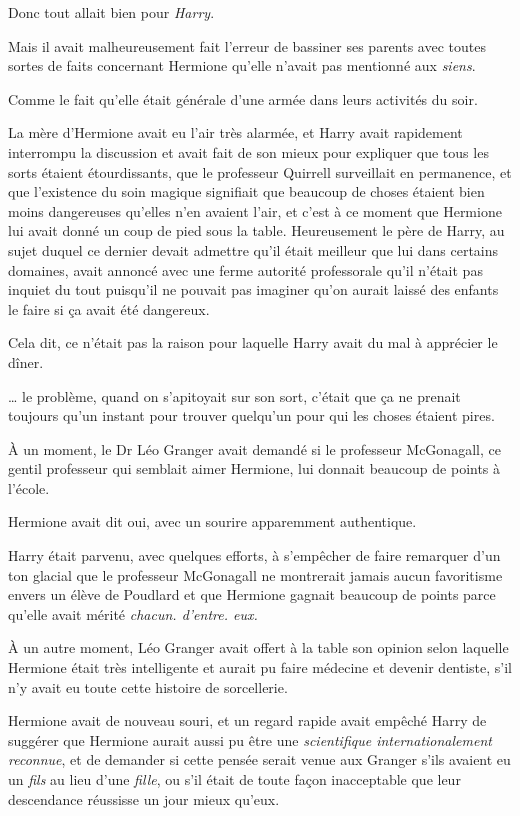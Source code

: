 Donc tout allait bien pour \emph{Harry}.

Mais il avait malheureusement fait l'erreur de bassiner ses parents avec toutes sortes de faits concernant Hermione qu'elle n'avait pas mentionné aux \emph{siens}.

Comme le fait qu'elle était générale d'une armée dans leurs activités du soir.

La mère d'Hermione avait eu l'air très alarmée, et Harry avait rapidement interrompu la discussion et avait fait de son mieux pour expliquer que tous les sorts étaient étourdissants, que le professeur Quirrell surveillait en permanence, et que l'existence du soin magique signifiait que beaucoup de choses étaient bien moins dangereuses qu'elles n'en avaient l'air, et c'est à ce moment que Hermione lui avait donné un coup de pied sous la table. Heureusement le père de Harry, au sujet duquel ce dernier devait admettre qu'il était meilleur que lui dans certains domaines, avait annoncé avec une ferme autorité professorale qu'il n'était pas inquiet du tout puisqu'il ne pouvait pas imaginer qu'on aurait laissé des enfants le faire si ça avait été dangereux.

Cela dit, ce n'était pas la raison pour laquelle Harry avait du mal à apprécier le dîner.

… le problème, quand on s'apitoyait sur son sort, c'était que ça ne prenait toujours qu'un instant pour trouver quelqu'un pour qui les choses étaient pires.

À un moment, le Dr Léo Granger avait demandé si le professeur McGonagall, ce gentil professeur qui semblait aimer Hermione, lui donnait beaucoup de points à l'école.

Hermione avait dit oui, avec un sourire apparemment authentique.

Harry était parvenu, avec quelques efforts, à s'empêcher de faire remarquer d'un ton glacial que le professeur McGonagall ne montrerait jamais aucun favoritisme envers un élève de Poudlard et que Hermione gagnait beaucoup de points parce qu'elle avait mérité \emph{chacun. d'entre. eux.}

À un autre moment, Léo Granger avait offert à la table son opinion selon laquelle Hermione était très intelligente et aurait pu faire médecine et devenir dentiste, s'il n'y avait eu toute cette histoire de sorcellerie.

Hermione avait de nouveau souri, et un regard rapide avait empêché Harry de suggérer que Hermione aurait aussi pu être une \emph{scientifique internationalement reconnue}, et de demander si cette pensée serait venue aux Granger s'ils avaient eu un \emph{fils} au lieu d'une \emph{fille}, ou s'il était de toute façon inacceptable que leur descendance réussisse un jour mieux qu'eux.

